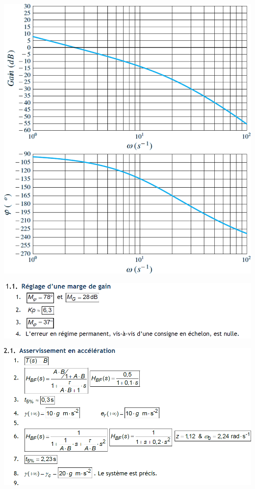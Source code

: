 \documentclass[10pt,fleqn]{article} %
\begin{document}
\begin{center}
\includegraphics[width=\linewidth]{images/fig_01}

\end{center}

\newpage
\begin{center}
\includegraphics[width=\linewidth]{images/cor_01}

\includegraphics[width=\linewidth]{images/cor_02}
\end{center}
\end{document}
